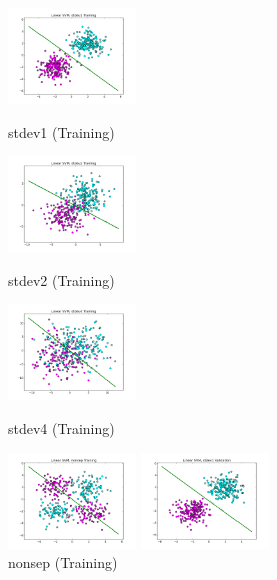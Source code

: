 \documentclass[10pt]{article}
\begin{document}
\begin{figure}[ht]
	\centering
	\begin{minipage}[b]{.24\linewidth}
		\includegraphics[width=1\linewidth, height=1in]{linear_svm_stdev1_train.png}
		\caption*{stdev1 (Training)}
	\end{minipage}
	\begin{minipage}[b]{.24\linewidth}
		\includegraphics[width=1\linewidth, height=1in]{linear_svm_stdev2_train.png}
		\caption*{stdev2 (Training)}
	\end{minipage}
	\begin{minipage}[b]{.24\linewidth}
		\includegraphics[width=1\linewidth, height=1in]{linear_svm_stdev4_train.png}
		\caption*{stdev4 (Training)}
	\end{minipage}
	\begin{minipage}[b]{.24\linewidth}
		\includegraphics[width=1\linewidth, height=1in]{linear_svm_nonsep_train.png}
		\caption*{nonsep (Training)}
	\end{minipage}
		\begin{minipage}[b]{.24\linewidth}
		\includegraphics[width=1\linewidth, height=1in]{linear_svm_stdev1_validation.png}

\end{minipage}
\end{figure}
\end{document}
